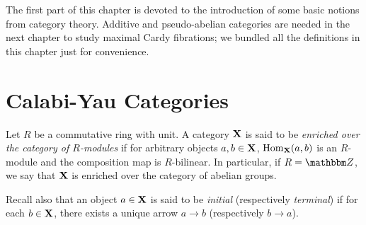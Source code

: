 
\vspace{250pt}

The first part of this chapter is devoted to the introduction of some
basic notions from category theory. Additive and pseudo-abelian
categories are needed in the next chapter to study maximal Cardy
fibrations; we bundled all the definitions in this chapter just for
convenience.

\section{Calabi-Yau Categories}
\label{sheaf_boundary_conditions}

Let $R$ be a commutative ring with unit. A category ${\bf X}$ is said
to be \emph{enriched over the category of $R$-modules} if for
arbitrary objects $a,b\in {\bf X}$, $\operatorname{Hom}_{\bf X}(a,b)$ is an
$R$-module and the composition map is $R$-bilinear. In particular, if
$R=\ent$, we say that ${\bf X}$ is enriched over the category of
abelian groups.

Recall also that an object $a\in {\bf X}$ is said to be \emph{initial}
(respectively \emph{terminal}) if for each $b\in {\bf X}$,
there exists a unique arrow $a\to b$ (respectively $b\to a$).

